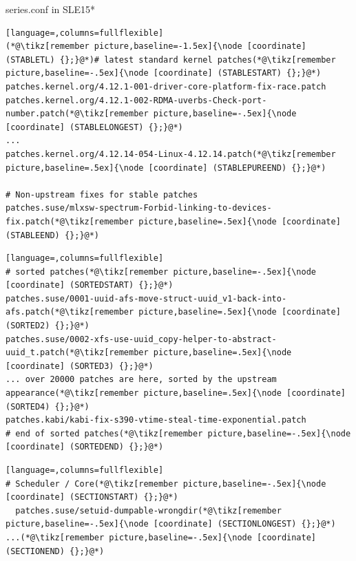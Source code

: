 \begin{frame}[fragile]{series.conf in SLE15*}

  \pause

  \begin{lstlisting}[language=,columns=fullflexible]
(*@\tikz[remember picture,baseline=-1.5ex]{\node [coordinate] (STABLETL) {};}@*)# latest standard kernel patches(*@\tikz[remember picture,baseline=-.5ex]{\node [coordinate] (STABLESTART) {};}@*)
patches.kernel.org/4.12.1-001-driver-core-platform-fix-race.patch
patches.kernel.org/4.12.1-002-RDMA-uverbs-Check-port-number.patch(*@\tikz[remember picture,baseline=-.5ex]{\node [coordinate] (STABLELONGEST) {};}@*)
...
patches.kernel.org/4.12.14-054-Linux-4.12.14.patch(*@\tikz[remember picture,baseline=.5ex]{\node [coordinate] (STABLEPUREEND) {};}@*)

# Non-upstream fixes for stable patches
patches.suse/mlxsw-spectrum-Forbid-linking-to-devices-fix.patch(*@\tikz[remember picture,baseline=.5ex]{\node [coordinate] (STABLEEND) {};}@*)
  \end{lstlisting}

  \pause

  \begin{lstlisting}[language=,columns=fullflexible]
# sorted patches(*@\tikz[remember picture,baseline=-.5ex]{\node [coordinate] (SORTEDSTART) {};}@*)
patches.suse/0001-uuid-afs-move-struct-uuid_v1-back-into-afs.patch(*@\tikz[remember picture,baseline=.5ex]{\node [coordinate] (SORTED2) {};}@*)
patches.suse/0002-xfs-use-uuid_copy-helper-to-abstract-uuid_t.patch(*@\tikz[remember picture,baseline=.5ex]{\node [coordinate] (SORTED3) {};}@*)
... over 20000 patches are here, sorted by the upstream appearance(*@\tikz[remember picture,baseline=.5ex]{\node [coordinate] (SORTED4) {};}@*)
patches.kabi/kabi-fix-s390-vtime-steal-time-exponential.patch
# end of sorted patches(*@\tikz[remember picture,baseline=-.5ex]{\node [coordinate] (SORTEDEND) {};}@*)

  \end{lstlisting}

  \pause

  \begin{lstlisting}[language=,columns=fullflexible]
# Scheduler / Core(*@\tikz[remember picture,baseline=-.5ex]{\node [coordinate] (SECTIONSTART) {};}@*)
  patches.suse/setuid-dumpable-wrongdir(*@\tikz[remember picture,baseline=-.5ex]{\node [coordinate] (SECTIONLONGEST) {};}@*)
...(*@\tikz[remember picture,baseline=-.5ex]{\node [coordinate] (SECTIONEND) {};}@*)
  \end{lstlisting}


\end{frame}
